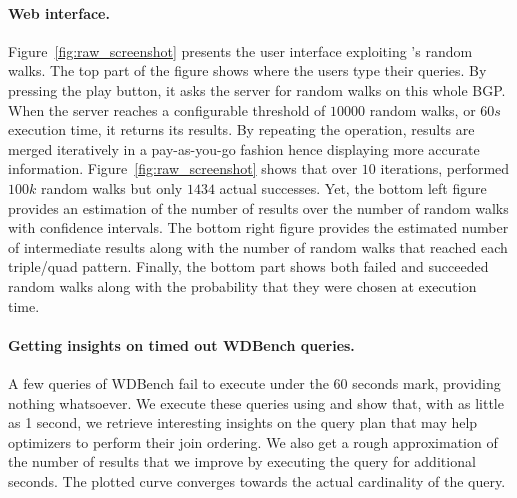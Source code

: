 \paragraph{Web interface.}
Figure~\ref{fig:raw_screenshot} presents the user interface exploiting
\NAME's random walks. The top part of the figure shows where the users
type their queries. By pressing the play button, it asks the server
for random walks on this whole BGP. When the server reaches a
configurable threshold of $10 000$ random walks, or $60s$ execution
time, it returns its results. By repeating the operation, results are
merged iteratively in a pay-as-you-go fashion hence displaying more
accurate information. Figure~\ref{fig:raw_screenshot} shows that over
$10$ iterations, \NAME performed $100k$ random walks but only $1434$
actual successes.  Yet, the bottom left figure provides an estimation
of the number of results over the number of random walks with
confidence intervals. The bottom right figure provides the estimated
number of intermediate results along with the number of random walks
that reached each triple/quad pattern.  Finally, the bottom part shows
both failed and succeeded random walks along with the probability that
they were chosen at execution time.

\paragraph{Getting insights on timed out WDBench queries.}
A few queries of WDBench fail to execute under the 60 seconds mark,
providing nothing whatsoever. We execute these queries using \NAME and
show that, with as little as 1 second, we retrieve interesting
insights on the query plan that may help optimizers to perform their
join ordering. We also get a rough approximation of the number of
results that we improve by executing the query for additional seconds.
The plotted curve converges towards the actual cardinality of the query.
